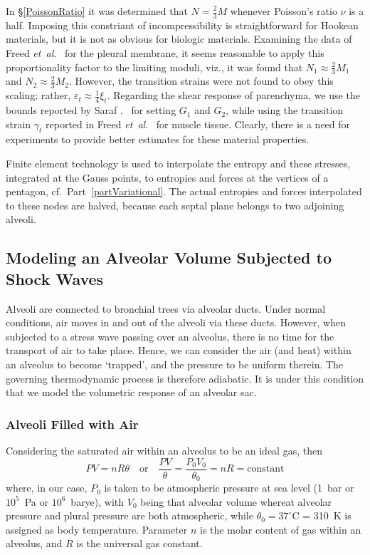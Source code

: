 In \S\ref{PoissonRatio} it was determined that $N = \tfrac{2}{3} M$ whenever Poisson's ratio $\nu$ is a half.  Imposing this constriant of incompressibility is straightforward for Hookean materials, but it is not as obvious for biologic materials.  Examining the data of Freed \textit{et~al}.\ \cite{Freedetal17} for the pleural membrane, it seems reasonable to apply this proportionality factor to the limiting moduli, viz., it was found that $N_1 \approx \tfrac{2}{3} M_1$ and $N_2 \approx \tfrac{2}{3} M_2$.  However, the transition strains were not found to obey this scaling; rather, $\varepsilon_t \approx \tfrac{1}{4} \xi_t$.  Regarding the shear response of parenchyma, we use the bounds reported by Saraf .\ \cite{Sarafetal07} for setting $G_1$ and $G_2$, while using the transition strain $\gamma_t$ reported in Freed \textit{et~al}.\ \cite{Freedetal17} for muscle tissue.  Clearly, there is a need for experiments to provide better estimates for these material properties.

Finite element technology is used to interpolate the entropy and these stresses, integrated at the Gauss points, to entropies and forces at the vertices of a pentagon, cf.\ Part~\ref{partVariational}.  The actual entropies and forces interpolated to these nodes are halved, because each septal plane belongs to two adjoining alveoli. 

\subsection{Modeling an Alveolar Volume Subjected to Shock Waves}
\label{sec:IdealGasLaw}

Alveoli are connected to bronchial trees via alveolar ducts.  Under normal conditions, air moves in and out of the alveoli via these ducts.  However, when subjected to a stress wave passing over an alveolus, there is no time for the transport of air to take place.  Hence, we can consider the air (and heat) within an alveolus to become `trapped', and the pressure to be uniform therein.  The governing thermo\-dynamic process is therefore adiabatic.  It is under this condition that we model the volumetric response of an alveolar sac.

\subsubsection{Alveoli Filled with Air}

Considering the saturated air within an alveolus to be an ideal gas, then \cite{Davison08}
\begin{equation}
P V = n \! R \theta
\quad \text{or} \quad
\frac{P V}{\theta} = \frac{P_0 V_0}{\theta_0} = n \! R = \mathrm{constant}
\label{idealGas}
\end{equation}
where, in our case, $P_0$ is taken to be atmospheric pressure at sea level (1~bar or $10^5$~Pa or $10^6$~barye), with $V_0$ being that alveolar volume whereat alveolar pressure and plural pressure are both atmospheric, while $\theta_0 = 37^{\circ}$C = 310~K is assigned as body temperature.  Parameter $n$ is the molar content of gas within an alveolus, and $R$ is the universal gas constant.  

